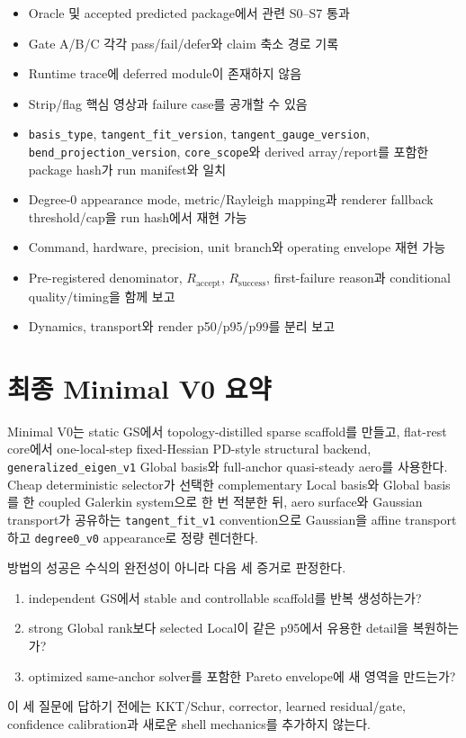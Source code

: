 \documentclass[11pt]{article}
\begin{document}
\begin{itemize}
  \item Oracle 및 accepted predicted package에서 관련 S0--S7 통과
  \item Gate A/B/C 각각 pass/fail/defer와 claim 축소 경로 기록
  \item Runtime trace에 deferred module이 존재하지 않음
  \item Strip/flag 핵심 영상과 failure case를 공개할 수 있음
  \item \nolinkurl{basis_type}, \nolinkurl{tangent_fit_version},
  \nolinkurl{tangent_gauge_version}, \nolinkurl{bend_projection_version},
  \nolinkurl{core_scope}와
  derived array/report를 포함한 package hash가 run manifest와 일치
  \item Degree-0 appearance mode, metric/Rayleigh mapping과 renderer fallback
  threshold/cap을 run hash에서 재현 가능
  \item Command, hardware, precision, unit branch와 operating envelope 재현 가능
  \item Pre-registered denominator, \(R_{\mathrm{accept}}\), \(R_{\mathrm{success}}\),
  first-failure reason과 conditional quality/timing을 함께 보고
  \item Dynamics, transport와 render p50/p95/p99를 분리 보고
\end{itemize}

\section{최종 Minimal V0 요약}

Minimal V0는 static GS에서 topology-distilled sparse scaffold를 만들고,
flat-rest core에서 one-local-step fixed-Hessian PD-style structural backend,
\texttt{generalized\_eigen\_v1} Global basis와 full-anchor quasi-steady aero를 사용한다.
Cheap deterministic selector가 선택한 complementary Local basis와 Global basis를
한 coupled Galerkin system으로 한 번 적분한 뒤, aero surface와 Gaussian transport가 공유하는
\texttt{tangent\_fit\_v1} convention으로 Gaussian을 affine transport하고
\texttt{degree0\_v0} appearance로 정량 렌더한다.

방법의 성공은 수식의 완전성이 아니라 다음 세 증거로 판정한다.

\begin{enumerate}
  \item independent GS에서 stable and controllable scaffold를 반복 생성하는가?
  \item strong Global rank보다 selected Local이 같은 p95에서 유용한 detail을 복원하는가?
  \item optimized same-anchor solver를 포함한 Pareto envelope에 새 영역을 만드는가?
\end{enumerate}

이 세 질문에 답하기 전에는 KKT/Schur, corrector, learned residual/gate,
confidence calibration과 새로운 shell mechanics를 추가하지 않는다.



\end{document}
